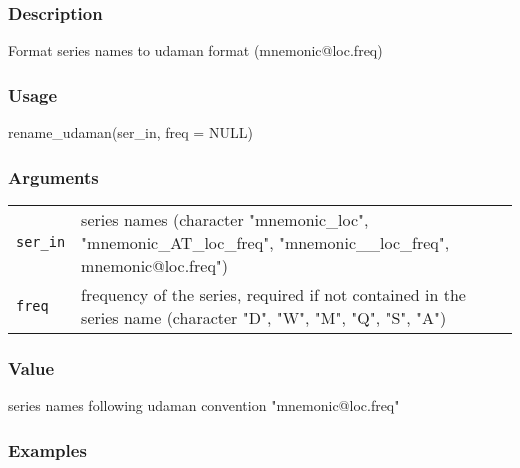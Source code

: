 \documentclass[
  letterpaper,
  DIV=11,
  numbers=noendperiod]{scrreport}
\newenvironment{Shaded}{\begin{snugshade}}{\end{snugshade}}
\newcommand{\AttributeTok}[1]{\textcolor[rgb]{0.40,0.45,0.13}{#1}}
\newcommand{\ConstantTok}[1]{\textcolor[rgb]{0.56,0.35,0.01}{#1}}
\newcommand{\FunctionTok}[1]{\textcolor[rgb]{0.28,0.35,0.67}{#1}}
\newcommand{\NormalTok}[1]{\textcolor[rgb]{0.00,0.23,0.31}{#1}}
\begin{document}
\subsubsection{Description}\label{description-59}

Format series names to udaman format (mnemonic@loc.freq)

\subsubsection{Usage}\label{usage-59}

\begin{Shaded}
\begin{Highlighting}[]
\FunctionTok{rename\_udaman}\NormalTok{(ser\_in, }\AttributeTok{freq =} \ConstantTok{NULL}\NormalTok{)}
\end{Highlighting}
\end{Shaded}

\subsubsection{Arguments}\label{arguments-59}

\begin{longtable}[]{@{}ll@{}}
\toprule\noalign{}
\endhead
\bottomrule\noalign{}
\endlastfoot
\texttt{ser\_in} & series names (character "mnemonic\_loc",
"mnemonic\_AT\_loc\_freq", "mnemonic\_\_loc\_freq",
mnemonic@loc.freq") \\
\texttt{freq} & frequency of the series, required if not contained in
the series name (character "D", "W", "M", "Q", "S", "A") \\
\end{longtable}

\subsubsection{Value}\label{value-59}

series names following udaman convention "mnemonic@loc.freq"

\subsubsection{Examples}\label{examples-59}
\end{document}
